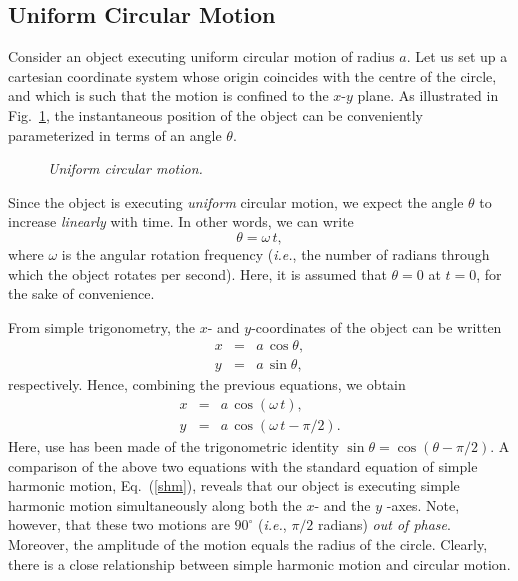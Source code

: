 \subsection{Uniform Circular Motion}
Consider an object executing uniform circular motion of radius $a$. Let us set
up a cartesian coordinate system whose origin coincides with the centre of the circle,
and which is such that the motion is confined to the $x$-$y$ plane.
As illustrated in Fig.~\ref{f100}, the instantaneous position of the object can be conveniently
parameterized in terms of an angle $\theta$. 

\begin{figure}
\epsfysize=3in
\centerline{}
\caption{\em Uniform circular motion.}\label{f100}  
\end{figure}

Since the object is executing {\em uniform} circular motion, we expect the angle $\theta$ to increase
{\em linearly} with time. In other words, we can write
\begin{equation}
\theta = \omega\,t,
\end{equation}
where $\omega$ is the angular rotation frequency ({\em i.e.}, the number of radians through which the
object rotates per second). Here, it is assumed that $\theta=0$ at $t=0$, for the sake of convenience. 

From simple trigonometry, the $x$- and $y$-coordinates of the object can be written
\begin{eqnarray}
x &=& a\,\cos\theta,\\[0.5ex]
y &=& a\,\sin\theta,
\end{eqnarray}
respectively. Hence, combining the previous equations, we obtain
\begin{eqnarray}
x &=& a\,\cos(\omega\,t),\\[0.5ex]
y &=& a\,\cos(\omega\,t - \pi/2).
\end{eqnarray}
Here, use has been made of the trigonometric identity $\sin\theta = \cos(\theta-\pi/2)$. 
A comparison of the above two equations with the standard equation of simple harmonic motion,
Eq.~(\ref{shm}), reveals that our object is executing simple harmonic motion simultaneously along both the
$x$- and the $y$ -axes. Note, however, that these two motions are $90^\circ$ ({\em i.e.}, $\pi/2$ radians)
{\em out of phase}. Moreover, the amplitude of the motion equals the radius of the circle.
 Clearly, there is a close relationship between simple harmonic motion
and circular motion.

